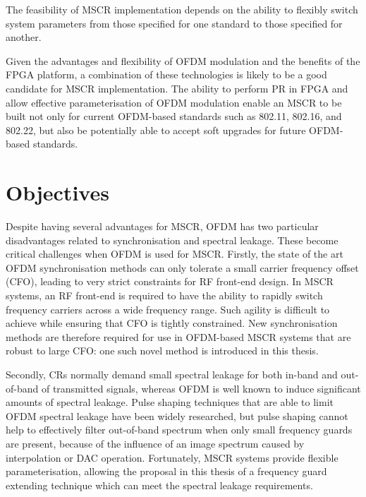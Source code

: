 The feasibility of MSCR implementation depends on the ability to flexibly switch system parameters from those specified for one standard to those specified for another.

Given the advantages and flexibility of OFDM modulation and the benefits of the FPGA platform, a combination of these technologies is likely to be a good candidate for MSCR implementation.
The ability to perform PR in FPGA and allow effective parameterisation of OFDM modulation enable an MSCR to be built not only for current OFDM-based standards such as 802.11, 802.16, and 802.22, but also be potentially able to accept soft upgrades for future OFDM-based standards.

\section{Objectives}

Despite having several advantages for MSCR, OFDM has two particular disadvantages related to synchronisation and spectral leakage. These become critical challenges when OFDM is used for MSCR.
Firstly, the state of the art OFDM synchronisation methods can only tolerate a small carrier frequency offset (CFO),  leading to very strict constraints for RF front-end design.
In MSCR systems, an RF front-end is required to have the ability to rapidly switch frequency carriers across a wide frequency range.
Such agility is difficult to achieve while ensuring that CFO is tightly constrained.
New synchronisation methods are therefore required for use in OFDM-based MSCR systems that are robust to large CFO: one such novel method is introduced in this thesis.

Secondly, CRs normally demand small spectral leakage for both in-band and out-of-band of transmitted signals, whereas OFDM is well known to induce significant amounts of spectral leakage.
Pulse shaping techniques that are able to limit OFDM spectral leakage have been widely researched, but pulse shaping cannot help to effectively filter out-of-band spectrum when only small frequency guards are present, because of the influence of an image spectrum caused by interpolation or DAC operation.
Fortunately, MSCR systems provide flexible parameterisation, allowing the proposal in this thesis of a frequency guard extending technique which can meet the spectral leakage requirements.

